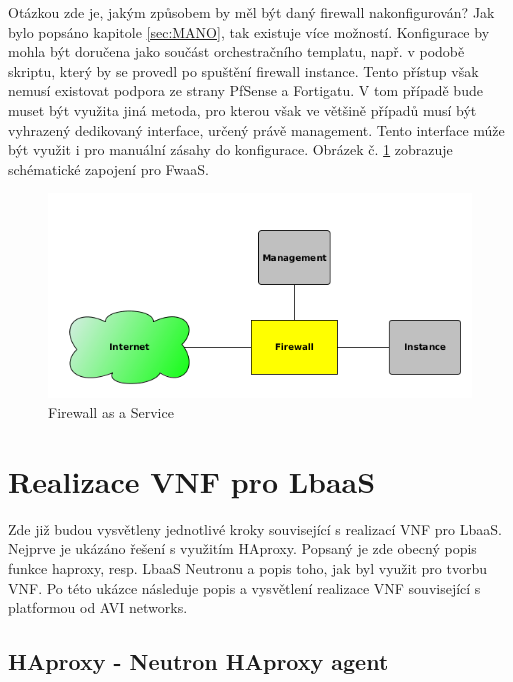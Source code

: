 Otázkou zde je, jakým způsobem by měl být daný firewall nakonfigurován? Jak bylo popsáno kapitole \ref{sec:MANO}, tak existuje více možností. Konfigurace by mohla být doručena jako součást orchestračního templatu, např. v podobě skriptu, který by se provedl po spuštění firewall instance. Tento přístup však nemusí existovat podpora ze strany PfSense a Fortigatu. V tom případě bude muset být využita jiná metoda, pro kterou však ve většině případů musí být vyhrazený dedikovaný interface, určený právě management. Tento interface múže být využit i pro manuální zásahy do konfigurace. Obrázek č. \ref{fig:firewall} zobrazuje schématické zapojení pro FwaaS.

\begin{figure}[h]
\begin{centering}
\includegraphics[scale=0.6]{images/firewall}
\par\end{centering}
\caption{Firewall as a Service\label{fig:firewall}}
\end{figure}


\section{Realizace VNF pro LbaaS} \label{sec:realizace_lbaas}

Zde již budou vysvětleny jednotlivé kroky související s realizací VNF pro LbaaS. Nejprve je ukázáno řešení s využitím HAproxy. Popsaný je zde obecný popis funkce haproxy, resp. LbaaS Neutronu a popis toho, jak byl využit pro tvorbu VNF. Po této ukázce následuje popis a vysvětlení realizace VNF související s platformou od AVI networks.

\subsection{HAproxy - Neutron HAproxy agent}


